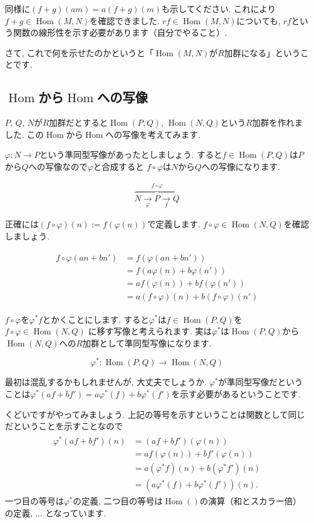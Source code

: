 \documentclass{jsarticle}
\newcommand{\makeop}[1]{\mathop{\mathrm{#1}}\nolimits}
\def\Hom{\makeop{Hom}}
\theoremstyle{definition}
\numberwithin{theorem}{section}
\begin{document}
同様に$(f+g)(am) = a(f+g)(m)$も示してください. これにより$f+g \in \Hom(M, N)$を確認できました.
$rf \in \Hom(M, N)$についても,
$rf$という関数の線形性を示す必要があります（自分でやること）.

さて, これで何を示せたのかというと「$\Hom(M, N)$が$R$加群になる」ということです.

\subsection{$\Hom$から$\Hom$への写像}
$P$, $Q$, $N$が$R$加群だとすると$\Hom(P, Q)$, $\Hom(N, Q)$という$R$加群を作れました.
この$\Hom$から$\Hom$への写像を考えてみます.

$\varphi: N \rightarrow P$という準同型写像があったとしましょう. すると$f \in \Hom(P, Q)$は$P$から$Q$への写像なので$\varphi$と合成すると
$f\circ \varphi$は$N$から$Q$への写像になります.

\begin{eqnarray*}
\overbrace{N \xrightarrow[\varphi]{} P \xrightarrow[f]{} Q}^{\displaystyle f \circ \varphi}
\end{eqnarray*}

正確には$(f\circ \varphi)(n) := f(\varphi(n))$で定義します. $f\circ \varphi \in \Hom(N, Q)$を確認しましょう.

\begin{eqnarray*}
\begin{aligned}
f\circ \varphi(an+bn') &= f(\varphi(an+bn'))\\
&= f(a\varphi(n) + b\varphi(n'))\\
&= af(\varphi(n)) + bf(\varphi(n'))\\
&= a(f\circ \varphi)(n) + b(f \circ \varphi)(n')
\end{aligned}
\end{eqnarray*}

$f\circ \varphi$を$\varphi^*f$とかくことにします. すると$\varphi^*$は$f \in \Hom(P, Q)$を$f\circ\varphi \in \Hom(N, Q)$
に移す写像と考えられます. 実は$\varphi^*$は$\Hom(P, Q)$から$\Hom(N, Q)$への$R$加群として準同型写像になります.

$$
\varphi^*: \Hom(P, Q) \rightarrow \Hom(N, Q)
$$

最初は混乱するかもしれませんが, 大丈夫でしょうか. $\varphi^*$が準同型写像だということは$\varphi^*(af+bf') = a\varphi^*(f) + b\varphi^*(f')$を示す必要があるということです.

くどいですがやってみましょう. 上記の等号を示すということは関数として同じだということを示すことなので
\begin{eqnarray*}
\begin{aligned}
\varphi^*(af+bf')(n) &= (af+bf')(\varphi(n))\\
&= af(\varphi(n)) + bf'(\varphi(n))\\
&= a(\varphi^*f)(n)+b(\varphi^*f')(n)\\
&= (a\varphi^*(f)+b\varphi^*(f'))(n).
\end{aligned}
\end{eqnarray*}
一つ目の等号は$\varphi^*$の定義, 二つ目の等号は$\Hom()$の演算（和とスカラー倍）の定義, ... となっています.
\end{document}
